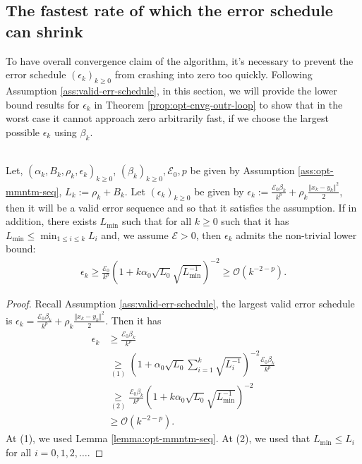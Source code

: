 \documentclass[12pt]{article}
\begin{document}
    \subsection{The fastest rate of which the error schedule can shrink}
        To have overall convergence claim of the algorithm, it's necessary to prevent the error schedule $(\epsilon_k)_{k \ge 0}$ from crashing into zero too quickly. 
        Following Assumption \ref{ass:valid-err-schedule}, in this section, we will provide the lower bound results for $\epsilon_k$ in Theorem \ref{prop:opt-cnvg-outr-loop} to show that in the worst case it cannot approach zero arbitrarily fast, if we choose the largest possible $\epsilon_k$ using $\beta_k$. 
        \begin{lemma}\;\label{lemma:err-schedule-lbnd}\\
            Let, $(\alpha_k, B_k, \rho_k, \epsilon_k)_{k \ge 0}$, $(\beta_k)_{k\ge 0}, \mathcal E_0, p$ be given by Assumption \ref{ass:opt-mmntm-seq}, $L_k := \rho_k + B_k$. 
            Let $(\epsilon_k)_{k \ge 0}$ be given by $\epsilon_k := \frac{\mathcal E_0 \beta_k}{k^p} + \rho_k \frac{\Vert x_k - y_k\Vert^2}{2}$, then it will be a valid error sequence and so that it satisfies the assumption. 
            If in addition, there exists $L_{\min}$ such that for all $k\ge 0$ such that it has $L_{\min} \le \min_{1 \le i \le k}L_i$ and, we assume $\mathcal E > 0$, then $\epsilon_k$ admits the non-trivial lower bound: 
            \begin{align*}
                \epsilon_k \ge \frac{\mathcal E_0}{k^p}\left(
                    1 + k \alpha_0 \sqrt{L_0} \sqrt{L_{\min}^{-1}}
                \right)^{-2} \ge \mathcal O(k^{-2-p}). 
            \end{align*}
        \end{lemma}
        \begin{proof}
            Recall Assumption \ref{ass:valid-err-schedule}, the largest valid error schedule is $\epsilon_k = \frac{\mathcal E_0 \beta_k}{k^p} + \rho_k \frac{\Vert x_k - y_k\Vert^2}{2}$. 
            Then it has 
            \begin{align*}
                \epsilon_k &\ge \frac{\mathcal E_0 \beta_k}{k^p}
                \\
                &\underset{(1)}{\ge} 
                \left(
                    1 + \alpha_0\sqrt{L_0}\sum_{i = 1}^{k}\sqrt{L_i^{-1}}
                \right)^{-2} 
                \frac{\mathcal E_0\beta_k}{k^p}
                \\
                &\underset{(2)}{\ge}
                \frac{\mathcal E_0\beta_k}{k^p}
                \left(
                    1 + k\alpha_0\sqrt{L_0}\sqrt{L_{\min}^{-1}}
                \right)^{-2} 
                \\
                &\ge \mathcal O(k^{-2-p}). 
            \end{align*}
            At (1), we used Lemma \ref{lemma:opt-mmntm-seq}. 
            At (2), we used that $L_{\min} \le L_i$ for all $i = 0, 1, 2, \ldots$. 
        \end{proof}
\end{document}
